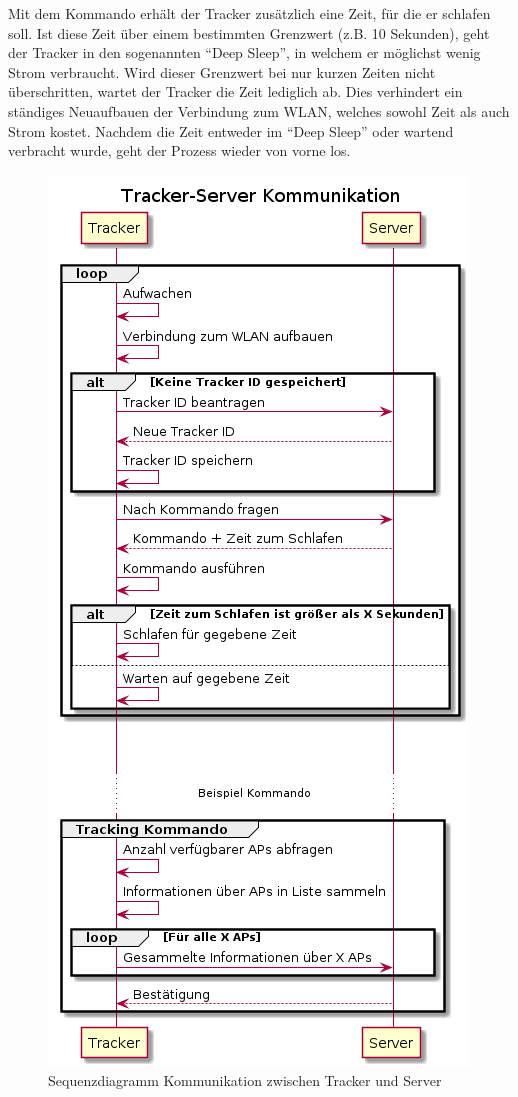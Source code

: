 Mit dem Kommando erhält der Tracker zusätzlich eine Zeit, für die er schlafen soll.
Ist diese Zeit über einem bestimmten Grenzwert (z.B. 10 Sekunden), geht der Tracker in den sogenannten \enquote{Deep Sleep},
in welchem er möglichst wenig Strom verbraucht.
Wird dieser Grenzwert bei nur kurzen Zeiten nicht überschritten, wartet der Tracker die Zeit lediglich ab.
Dies verhindert ein ständiges Neuaufbauen der Verbindung zum \gls{WLAN}, welches sowohl Zeit als auch Strom kostet.
Nachdem die Zeit entweder im \enquote{Deep Sleep} oder wartend verbracht wurde, geht der Prozess wieder von vorne los.

\begin{figure}[]
	\includegraphics[height=0.9\textheight]{images/communication.png}
	\centering
	\caption{Sequenzdiagramm Kommunikation zwischen Tracker und Server}
	\label{fig:tracker_comm}
\end{figure}

